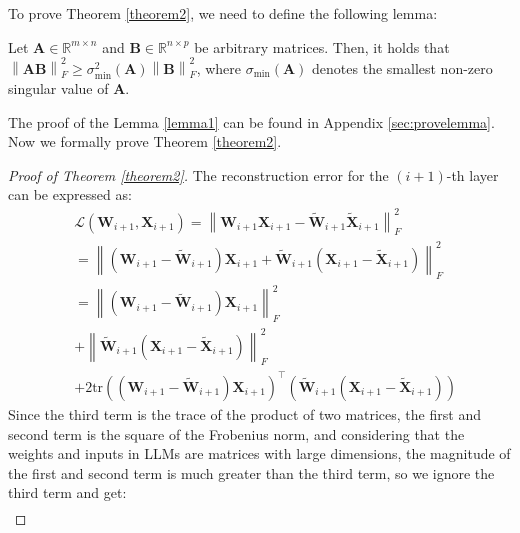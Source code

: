 To prove Theorem \ref{theorem2}, we need to define the following lemma:
\begin{lemma}\label{lemma1} Let \(\boldsymbol{A} \in \mathbb{R}^{m \times n}\) and \(\boldsymbol{B} \in \mathbb{R}^{n \times p}\) be arbitrary matrices. Then, it holds that \( \left\lVert \boldsymbol{AB} \right\rVert_F^2 \geq \sigma_{\min}^2(\boldsymbol{A}) \left\lVert \boldsymbol{B} \right\rVert_F^2\), where \(\sigma_{\min}(\boldsymbol{A})\) denotes the smallest non-zero singular value of \(\boldsymbol{A}\).

\end{lemma}
The proof of the Lemma \ref{lemma1} can be found in Appendix \ref{sec:provelemma}. Now we formally prove Theorem \ref{theorem2}.

\begin{proof}[Proof of Theorem \ref{theorem2}]
The reconstruction error for the \((i+1)\)-th layer can be expressed as:
\begin{equation}
\begin{aligned}
&\mathcal{L}(\boldsymbol{W}_{i+1}, \boldsymbol{X}_{i+1}) 
= \left\lVert \boldsymbol{W}_{i+1}\boldsymbol{X}_{i+1} - \widetilde{\boldsymbol{W}}_{i+1}\widetilde{\boldsymbol{X}}_{i+1} \right\rVert_F^2 \\
&= \left\lVert (\boldsymbol{W}_{i+1} - \widetilde{\boldsymbol{W}}_{i+1})\boldsymbol{X}_{i+1} + \widetilde{\boldsymbol{W}}_{i+1}(\boldsymbol{X}_{i+1} - \widetilde{\boldsymbol{X}}_{i+1}) \right\rVert_F^2 \\
&= \left\lVert (\boldsymbol{W}_{i+1} - \widetilde{\boldsymbol{W}}_{i+1})\boldsymbol{X}_{i+1} \right\rVert_F^2 \\
&+ \left\lVert \widetilde{\boldsymbol{W}}_{i+1}(\boldsymbol{X}_{i+1} - \widetilde{\boldsymbol{X}}_{i+1}) \right\rVert_F^2 \\
& + 2\text{tr}(( \boldsymbol{W}_{i+1} - \widetilde{\boldsymbol{W}}_{i+1})\boldsymbol{X}_{i+1})^{\top}(\widetilde{\boldsymbol{W}}_{i+1}(\boldsymbol{X}_{i+1} - \widetilde{\boldsymbol{X}}_{i+1}))
\end{aligned}
\end{equation}
Since the third term is the trace of the product of two matrices, the first and second term is the square of the Frobenius norm, and considering that the weights and inputs in LLMs are matrices with large dimensions, the magnitude of the first and second term is much greater than the third term, so we ignore the third term and get:
\begin{equation}
\begin{aligned}

\end{aligned}
\end{equation}
\end{proof}
